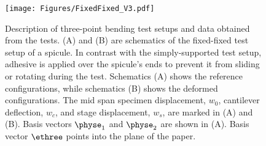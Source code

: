


\begin{figure}[H]
\centering
\texttt{[image: Figures/FixedFixed\_V3.pdf]}
\caption{
Description of three-point bending test setups and data obtained from the tests.
(\textsf{A}) and (\textsf{B}) are schematics of the fixed-fixed test setup of a spicule. In contrast with the simply-supported test setup, adhesive is applied over the spicule's ends to prevent it from sliding or rotating during the test.
Schematics (\textsf{A}) shows the reference configurations, while schematics (\textsf{B}) shows the deformed configurations. The mid span specimen displacement, $w_0$, cantilever deflection, $w_c$, and stage displacement, $w_s$, are marked in (\textsf{A}) and (\textsf{B}).
Basis vectors $\physe_1$ and $\physe_2$ are shown in (\textsf{A}). Basis vector $\ethree$ points into the plane of the paper.
}
\label{fig:FFconfig}
\end{figure}
